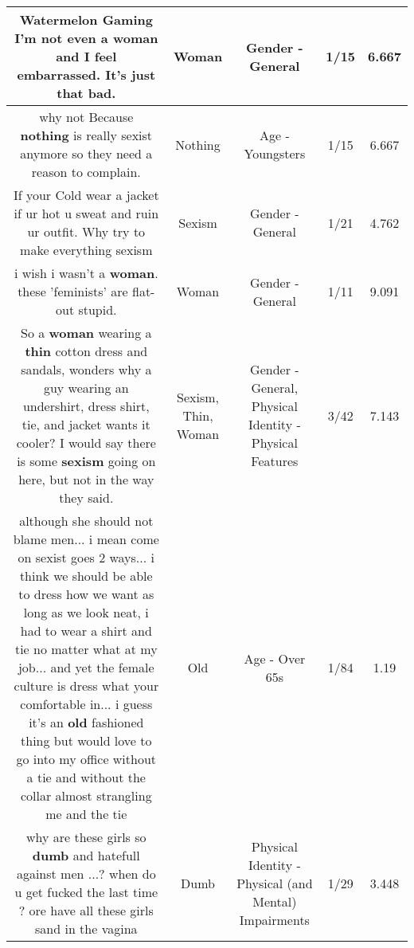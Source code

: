 \documentclass[11pt]{article}
\newlength\mylength
\begin{document}
\begin{center}
\begin{longtable}{|C{.65\mylength}|C{.30\mylength}|C{.12\mylength}|C{.12\mylength}|C{.12\mylength}|}
  \small Watermelon Gaming I'm not even a \textbf{woman} and I feel embarrassed. It's just that bad.\normalsize   & Woman & Gender - General & 1/15 & 6.667 \\  \hline
  \small why not Because \textbf{nothing} is really sexist anymore so they need a reason to complain.\normalsize   & Nothing & Age - Youngsters & 1/15 & 6.667 \\  \hline
  \small If your Cold wear a jacket if ur hot u sweat and ruin ur outfit. Why try to make everything sexism\normalsize   & Sexism & Gender - General & 1/21 & 4.762 \\  \hline
  \small i wish i wasn't a \textbf{woman}. these 'feminists' are flat-out stupid.\normalsize   & Woman & Gender - General & 1/11 & 9.091 \\  \hline
  \small So a \textbf{woman} wearing a \textbf{thin} cotton dress and sandals, wonders why a guy wearing an undershirt, dress shirt, tie, and jacket wants it cooler? I would say there is some \textbf{sexism} going on here, but not in the way they said.\normalsize   & Sexism, Thin, Woman & Gender - General, Physical Identity - Physical Features & 3/42 & 7.143 \\  \hline
  \small although she should not blame men... i mean come on sexist goes 2 ways... i think we should be able to dress how we want as long as we look neat, i had to wear a shirt and tie no matter what at my job... and yet the female culture is dress what your comfortable in... i guess it's an \textbf{old} fashioned thing but would love to go into my office without a tie and without the collar almost strangling me and the tie\normalsize   & Old & Age - Over 65s & 1/84 & 1.19 \\  \hline
  \small why are these girls so \textbf{dumb} and hatefull against men ...? when  do u get fucked the last time ? ore have all these girls sand in the vagina\normalsize   & Dumb & Physical Identity - Physical (and Mental) Impairments & 1/29 & 3.448 \\  \hline

\end{longtable}
\end{center}
\end{document}
